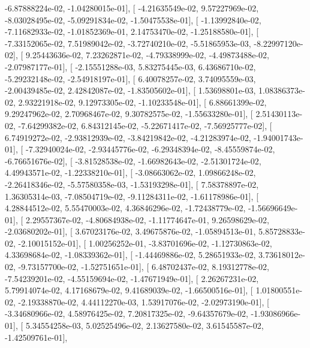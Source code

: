 \documentclass{article}
\begin{document}
         -6.87888224e-02,  -1.04280015e-01],
       [ -4.21635549e-02,   9.57227969e-02,  -8.03028495e-02,
         -5.09291834e-02,  -1.50475538e-01],
       [ -1.13992840e-02,  -7.11682933e-02,  -1.01852369e-01,
          2.14753470e-02,  -1.25188580e-01],
       [ -7.33152065e-02,   7.51989042e-02,  -3.72740210e-02,
         -5.51865953e-03,  -8.22997120e-02],
       [  9.25443636e-02,   7.23262871e-02,  -4.79338999e-02,
         -4.49873488e-02,  -2.07987177e-01],
       [ -2.15551288e-03,   5.83275445e-03,   6.43686710e-02,
         -5.29232148e-02,  -2.54918197e-01],
       [  6.40078257e-02,   3.74095559e-03,  -2.00439485e-02,
          2.42842087e-02,  -1.83505602e-01],
       [  1.53698801e-03,   1.08386373e-02,   2.93221918e-02,
          9.12973305e-02,  -1.10233548e-01],
       [  6.88661399e-02,   9.29247962e-02,   2.70968467e-02,
          9.30782575e-02,  -1.55633280e-01],
       [  2.51430113e-02,  -7.64299382e-02,   6.84312145e-02,
         -5.22671417e-02,  -7.56925777e-02],
       [  6.74919272e-02,  -2.93812939e-02,  -3.84219842e-02,
         -4.21283974e-02,  -1.94001743e-01],
       [ -7.32940024e-02,  -2.93445776e-02,  -6.29348394e-02,
         -8.45559874e-02,  -6.76651676e-02],
       [ -3.81528538e-02,  -1.66982643e-02,  -2.51301724e-02,
          4.49943571e-02,  -1.22338210e-01],
       [ -3.08663062e-02,   1.09866248e-02,  -2.26418346e-02,
         -5.57580358e-03,  -1.53193298e-01],
       [  7.58378897e-02,   1.36305314e-03,  -7.08504719e-02,
         -9.11284311e-02,  -1.61178986e-01],
       [  4.28844512e-02,   5.55470003e-02,   4.36846296e-02,
         -1.72438779e-02,  -1.56696649e-01],
       [  2.29557367e-02,  -4.80684938e-02,  -1.11774647e-01,
          9.26598629e-02,  -2.03680202e-01],
       [  3.67023176e-02,   3.49675876e-02,  -1.05894513e-01,
          5.85728833e-02,  -2.10015152e-01],
       [  1.00256252e-01,  -3.83701696e-02,  -1.12730863e-02,
          4.33698684e-02,  -1.08339362e-01],
       [ -1.44469886e-02,   5.28651933e-02,   3.73618012e-02,
         -9.73157700e-02,  -1.52751651e-01],
       [  6.48702437e-02,   8.19312778e-02,  -7.54239201e-02,
         -4.55159694e-02,  -1.47671949e-01],
       [  2.26267231e-02,   5.79914074e-02,   4.17168679e-02,
          9.41689039e-02,  -1.66500516e-01],
       [  1.01800551e-02,  -2.19338870e-02,   4.44112270e-03,
          1.53917076e-02,  -2.02973190e-01],
       [ -3.34680966e-02,   4.58976425e-02,   7.20817325e-02,
         -9.64357679e-02,  -1.93086966e-01],
       [  5.34554258e-03,   5.02525496e-02,   2.13627580e-02,
          3.61545587e-02,  -1.42509761e-01],
\end{document}

